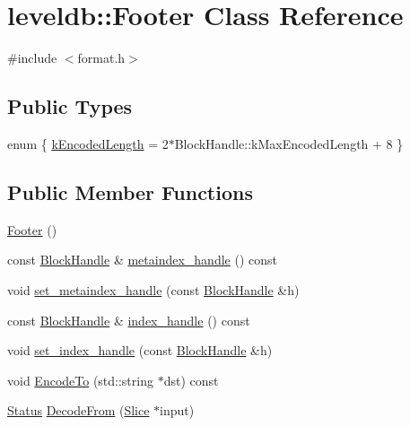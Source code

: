 \hypertarget{classleveldb_1_1_footer}{}\section{leveldb\+:\+:Footer Class Reference}
\label{classleveldb_1_1_footer}


{\ttfamily \#include $<$format.\+h$>$}

\subsection*{Public Types}
\begin{DoxyCompactItemize}
\item 
enum \{ \hyperlink{classleveldb_1_1_footer_a83b9789b124c3963f4d9cedd47b58ff6a52c5b622f817edcfaf2bb274851a3791}{k\+Encoded\+Length} = 2$\ast$\+Block\+Handle\+:\+:k\+Max\+Encoded\+Length + 8
 \}
\end{DoxyCompactItemize}
\subsection*{Public Member Functions}
\begin{DoxyCompactItemize}
\item 
\hyperlink{classleveldb_1_1_footer_ab549912506721bad11eda55be5a04a82}{Footer} ()
\item 
const \hyperlink{classleveldb_1_1_block_handle}{Block\+Handle} \& \hyperlink{classleveldb_1_1_footer_a44f2334ed064f7045d76b898f5fadb6a}{metaindex\+\_\+handle} () const 
\item 
void \hyperlink{classleveldb_1_1_footer_ac937207010f61550c703b2d732422566}{set\+\_\+metaindex\+\_\+handle} (const \hyperlink{classleveldb_1_1_block_handle}{Block\+Handle} \&h)
\item 
const \hyperlink{classleveldb_1_1_block_handle}{Block\+Handle} \& \hyperlink{classleveldb_1_1_footer_aae1a72a668da9eae3fa2f6620e3ea559}{index\+\_\+handle} () const 
\item 
void \hyperlink{classleveldb_1_1_footer_ae2f4be5947f5e4983a160d6d01edea68}{set\+\_\+index\+\_\+handle} (const \hyperlink{classleveldb_1_1_block_handle}{Block\+Handle} \&h)
\item 
void \hyperlink{classleveldb_1_1_footer_ac0148e441c2f25d7d24ec14ba2099f58}{Encode\+To} (std\+::string $\ast$dst) const 
\item 
\hyperlink{classleveldb_1_1_status}{Status} \hyperlink{classleveldb_1_1_footer_a3cbcb311694e4cf410358f97d53d94e3}{Decode\+From} (\hyperlink{classleveldb_1_1_slice}{Slice} $\ast$input)
\end{DoxyCompactItemize}


